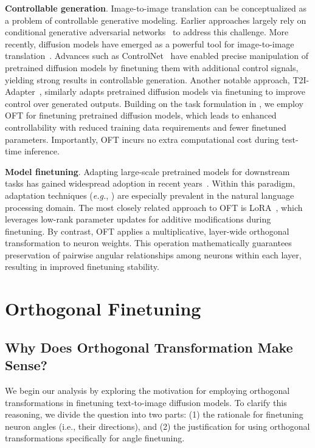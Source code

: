 \textbf{Controllable generation}. Image-to-image translation can be conceptualized as a problem of controllable generative modeling. Earlier approaches largely rely on conditional generative adversarial networks~\cite{isola2017image,zhu2017toward,wang2018high,park2019semantic,choi2018stargan} to address this challenge. More recently, diffusion models have emerged as a powerful tool for image-to-image translation~\cite{saharia2022palette,voynov2022sketch,wang2022pretraining}. Advances such as ControlNet~\cite{zhang2023adding} have enabled precise manipulation of pretrained diffusion models by finetuning them with additional control signals, yielding strong results in controllable generation. Another notable approach, T2I-Adapter~\cite{mou2023t2i}, similarly adapts pretrained diffusion models via finetuning to improve control over generated outputs. Building on the task formulation in \cite{zhang2023adding,mou2023t2i}, we employ OFT for finetuning pretrained diffusion models, which leads to enhanced controllability with reduced training data requirements and fewer finetuned parameters. Importantly, OFT incurs no extra computational cost during test-time inference.

\textbf{Model finetuning}. Adapting large-scale pretrained models for downstream tasks has gained widespread adoption in recent years~\cite{devlin2018bert,brown2020language,he2022masked}. Within this paradigm, adaptation techniques (\emph{e.g.}, \cite{hulora2022,houlsby2019parameter,pfeiffer2020adapterfusion}) are especially prevalent in the natural language processing domain. The most closely related approach to OFT is LoRA~\cite{hulora2022}, which leverages low-rank parameter updates for additive modifications during finetuning. By contrast, OFT applies a multiplicative, layer-wide orthogonal transformation to neuron weights. This operation mathematically guarantees preservation of pairwise angular relationships among neurons within each layer, resulting in improved finetuning stability.

\section{Orthogonal Finetuning}

\subsection{Why Does Orthogonal Transformation Make Sense?}

We begin our analysis by exploring the motivation for employing orthogonal transformations in finetuning text-to-image diffusion models. To clarify this reasoning, we divide the question into two parts: (1) the rationale for finetuning neuron angles (i.e., their directions), and (2) the justification for using orthogonal transformations specifically for angle finetuning.

